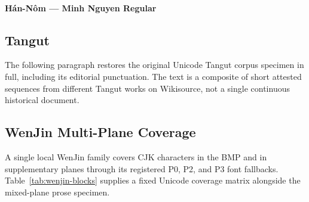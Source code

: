\documentclass[11pt,twoside]{impeart}
\begin{document}
\paragraph{Hán-Nôm --- Minh Nguyen Regular}

\subsection{Tangut}

The following paragraph restores the original Unicode Tangut corpus
specimen in full, including its editorial punctuation. The text is a
composite of short attested sequences from different Tangut works on
Wikisource, not a single continuous historical document.


\subsection{WenJin Multi-Plane Coverage}

A single local WenJin family covers CJK characters in the BMP and in
supplementary planes through its registered P0, P2, and P3 font fallbacks.
Table~\ref{tab:wenjin-blocks} supplies a fixed Unicode coverage matrix
alongside the mixed-plane prose specimen.

\end{document}
